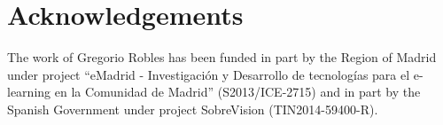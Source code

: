 \documentclass[conference]{IEEEtran}
\begin{document}
\section{Acknowledgements}

The work of Gregorio Robles has been funded in part by the Region of Madrid under project ``eMadrid - Investigaci\'on y Desarrollo de tecnolog\'ias para el e-learning en la Comunidad de Madrid'' (S2013/ICE-2715) and in part by the Spanish Government under project SobreVision (TIN2014-59400-R).




\end{document}

